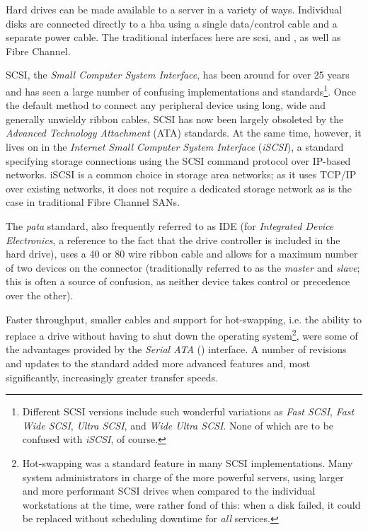 Hard drives can be made available to a server in a
variety of ways.  Individual disks are connected
directly to a \gls{hba} using
a single data/control cable and a separate power
cable.  The traditional interfaces here are
\gls{scsi},  and
, as well as Fibre
Channel.

SCSI, the {\em Small Computer System Interface}, has
been around for over 25 years and has seen a large
number of confusing implementations and
standards\footnote{Different SCSI versions include
such wonderful variations as {\em Fast SCSI}, {\em
Fast Wide SCSI}, {\em Ultra SCSI}, and {\em Wide Ultra
SCSI}. None of which are to be confused with {\em
iSCSI}, of course.}.  Once the default method to
connect any peripheral device using long, wide and
generally unwieldy ribbon cables, SCSI has now been
largely obsoleted by the {\em Advanced Technology
Attachment} (ATA) standards.  At the same
time, however, it lives on in the {\em Internet Small
Computer System Interface} ({\em iSCSI}),
a standard specifying storage connections using the
SCSI command protocol over IP-based networks.  iSCSI
is a common choice in storage area networks; as it
uses TCP/IP over existing networks, it
does not require a dedicated storage network as is the
case in traditional Fibre Channel SANs.

The {\em \gls{pata}} standard, also frequently
referred to as IDE (for {\em Integrated
Device Electronics}, a reference to the fact that the
drive controller is included in the hard drive), uses
a 40 or 80 wire ribbon cable and allows for a maximum
number of two devices on the connector (traditionally
referred to as the {\em master} and {\em slave}; this
is often a source of confusion, as neither device
takes control or precedence over the other).

Faster throughput, smaller cables and support for
hot-swapping, i.e. the ability to replace a drive
without having to shut down the operating
system\footnote{Hot-swapping was a standard feature in
many SCSI implementations.  Many system administrators
in charge of the more powerful servers, using larger
and more performant SCSI drives when compared to the
individual workstations at the time, were rather fond
of this: when a disk failed, it could be replaced
without scheduling downtime for {\em all} services.},
were some of the advantages provided by the {\em
Serial ATA} ()
interface.  A number of revisions and updates to the
standard added more advanced features and, most
significantly, increasingly greater transfer speeds.

